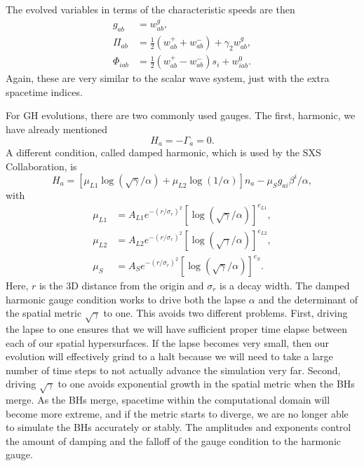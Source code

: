 \begin{bibunit}[unsrtnat]
The evolved variables in terms of the characteristic speeds are then
\begin{align}
  g_{ab} &= w^g_{ab}, \\
  \Pi_{ab} &= \frac{1}{2}\left(w^+_{ab} + w^-_{ab}\right)+\gamma_2 w^g_{ab}, \\
  \Phi_{iab} &= \frac{1}{2}\left(w^+_{ab} - w^-_{ab}\right)s_i + w^0_{iab}.
\end{align}
Again, these are very similar to the scalar wave system, just with the extra
spacetime indices.

For GH evolutions, there are two commonly used gauges. The first, harmonic, we
have already mentioned
\begin{equation}
   H_a = -\Gamma_a = 0 .
\end{equation}
A different condition, called damped harmonic, which is used by the SXS
Collaboration, is
\begin{equation}
  H_a = \left[\mu_{L1} \log\left(\sqrt{\gamma}/\alpha\right) + \mu_{L2}
          \log\left(1/\alpha\right)\right] n_a - \mu_S g_{ai} \beta^i / \alpha,
\end{equation}
with
\begin{align}
  \mu_{L1} &= A_{L1} e^{-(r/\sigma_r)^2}
               \left[\log(\sqrt{\gamma}/\alpha)\right]^{e_{L1}},\\
  \mu_{L2} &= A_{L2} e^{-(r/\sigma_r)^2}
               \left[\log(\sqrt{\gamma}/\alpha)\right]^{e_{L2}},\\
  \mu_{S} &= A_{S} e^{-(r/\sigma_r)^2}
              \left[\log(\sqrt{\gamma}/\alpha)\right]^{e_{S}}.
\end{align}
Here, $r$ is the 3D distance from the origin and $\sigma_r$ is a decay width.
The damped harmonic gauge condition works to drive both the lapse $\alpha$ and
the determinant of the spatial metric $\sqrt{\gamma}$ to one. This avoids two
different problems. First, driving the lapse to one ensures that we will have
sufficient proper time elapse between each of our spatial hypersurfaces. If the
lapse becomes very small, then our evolution will effectively grind to a halt
because we will need to take a large number of time steps to not actually
advance the simulation very far. Second, driving $\sqrt{\gamma}$ to one avoids
exponential growth in the spatial metric when the BHs merge. As the BHs merge,
spacetime within the computational domain will become more extreme, and if the
metric starts to diverge, we are no longer able to simulate the BHs accurately
or stably. The amplitudes and exponents control the amount of damping and the
falloff of the gauge condition to the harmonic gauge.


\end{bibunit}
